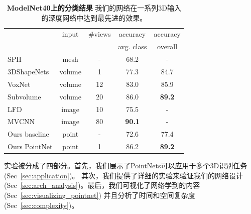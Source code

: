 \begin{table}[t!]
    \small
    \centering
    \begin{tabular}[width=\linewidth]{l|c|c|c|c}
    \hline
    ~               & input        & \#views    & accuracy & accuracy \\ 
    ~ & & & avg. class & overall \\ \hline
    SPH~\cite{kazhdan2003rotation}             & mesh        & - & 68.2         & -  \\ \hline
    3DShapeNets~\cite{wu20153d}     & volume       & 1        & 77.3  & 84.7 \\
    VoxNet~\cite{maturana2015voxnet}          & volume       & 12        & 83.0 & 85.9 \\
    Subvolume~\cite{qi2016volumetric}    & volume       & 20      & 86.0  & \textbf{89.2} \\ \hline
    LFD~\cite{wu20153d}             & image        & 10        & 75.5 & -\\
    MVCNN~\cite{su15mvcnn}           & image        & 80        & \textbf{90.1} & -\\ \hline
    Ours baseline  & point    & -     & 72.6  & 77.4\\
    Ours PointNet   & point   & 1        & 86.2 & \textbf{89.2} \\ \hline
    \end{tabular}
    \caption{\textbf{ModelNet40上的分类结果} 我们的网络在一系列3D输入的深度网络中达到最先进的效果。}
    \label{tab:classification}
\end{table}
\label{sec:exp}
实验被分成了四部分。首先，我们展示了PointNets可以应用于多个3D识别任务 (Sec~\ref{sec:application})。 其次，我们提供了详细的实验来验证我们的网络设计 (Sec~\ref{sec:arch_analysis})。最后，我们可视化了网络学到的内容 (Sec~\ref{sec:visualizing_pointnet}) 并且分析了时间和空间复杂度 (Sec~\ref{sec:complexity})。



